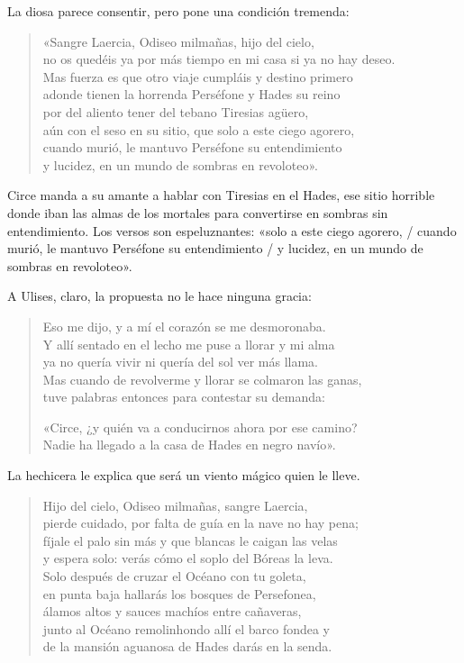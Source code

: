 La diosa parece consentir, pero pone una condición tremenda:

\begin{verse}
«Sangre Laercia, Odiseo milmañas, hijo del cielo,\\
no os quedéis ya por más tiempo en mi casa si ya no hay deseo.\\
Mas fuerza es que otro viaje cumpláis y destino primero\\
adonde tienen la horrenda Perséfone y Hades su reino\\
por del aliento tener del tebano Tiresias agüero,\\
aún con el seso en su sitio, que solo a este ciego agorero,\\
cuando murió, le mantuvo Perséfone su entendimiento\\
y lucidez, en un mundo de sombras en revoloteo».
\end{verse}

Circe manda a su amante a hablar con Tiresias en el Hades, ese sitio horrible donde iban las almas de los mortales para convertirse en sombras sin entendimiento. Los versos son espeluznantes: «solo a este ciego agorero, / cuando murió, le mantuvo Perséfone su entendimiento / y lucidez, en un mundo de sombras en revoloteo».

A Ulises, claro, la propuesta no le hace ninguna gracia:

\begin{verse}
Eso me dijo, y a mí el corazón se me desmoronaba.\\
Y allí sentado en el lecho me puse a llorar y mi alma\\
ya no quería vivir ni quería del sol ver más llama.\\
Mas cuando de revolverme y llorar se colmaron las ganas,\\
tuve palabras entonces para contestar su demanda:

«Circe, ¿y quién va a conducirnos ahora por ese camino?\\
Nadie ha llegado a la casa de Hades en negro navío».
\end{verse}

La hechicera le explica que será un viento mágico quien le lleve.

\begin{verse}
Hijo del cielo, Odiseo milmañas, sangre Laercia,\\
pierde cuidado, por falta de guía en la nave no hay pena;\\
fíjale el palo sin más y que blancas le caigan las velas\\
y espera solo: verás cómo el soplo del Bóreas la leva.\\
Solo después de cruzar el Océano con tu goleta,\\
en punta baja hallarás los bosques de Persefonea,\\
álamos altos y sauces machíos entre cañaveras,\\
junto al Océano remolinhondo allí el barco fondea y\\
de la mansión aguanosa de Hades darás en la senda.
\end{verse}

